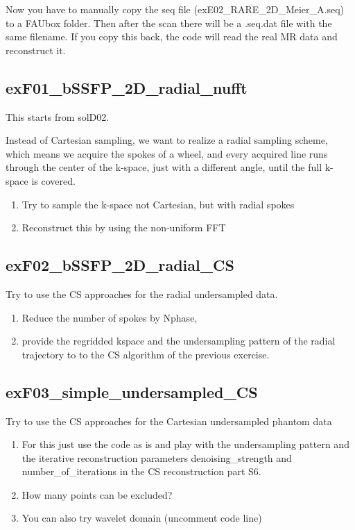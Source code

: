 \documentclass[a4paper,12pt]{extarticle}
\begin{document}
Now you have to manually copy the seq file (exE02\_RARE\_2D\_Meier\_A.seq) to a FAUbox folder. Then after the scan there will be a .seq.dat file with the same filename. If you copy this back, the code will read the real MR data and reconstruct it. 

\subsection{exF01\_bSSFP\_2D\_radial\_nufft}
This starts from solD02.

Instead of Cartesian sampling, we want to realize a radial sampling scheme, which means we acquire the spokes of a wheel, and every acquired line runs through the center of the k-space, just with a different angle, until the full k-space is covered.

\begin{enumerate}
\item Try to sample the k-space not Cartesian, but with radial spokes
\item Reconstruct this by using the non-uniform FFT
\end{enumerate}


\subsection{exF02\_bSSFP\_2D\_radial\_CS}     
Try to use the CS approaches for the radial undersampled data.

\begin{enumerate}
\item Reduce the number of spokes by Nphase, 
\item provide the regridded kspace and the undersampling pattern of the radial trajectory to to the CS algorithm of the previous exercise.
\end{enumerate}

\subsection{exF03\_simple\_undersampled\_CS}   
Try to use the CS approaches for the Cartesian undersampled phantom data
\begin{enumerate}
\item For this just use the code as is and play with the undersampling pattern and the iterative reconstruction parameters denoising\_strength and number\_of\_iterations in the CS reconstruction part S6.
\item How many points can be excluded?
\item You can also try wavelet domain (uncomment code line)
\end{enumerate}
\end{document}
